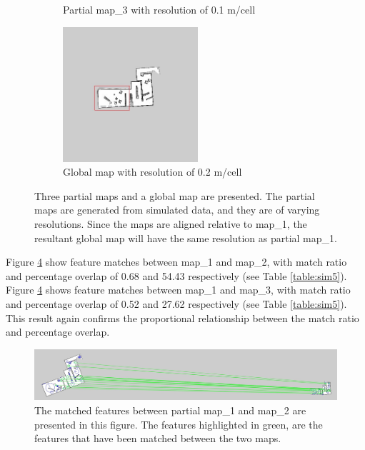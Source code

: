 \begin{figure}[H]
\begin{subfigure}{0.5\textwidth}
\caption{Partial map\_3 with resolution of 0.1 m/cell}
\label{fig:sim53}
\end{subfigure}
\begin{subfigure}{0.5\textwidth}
\centering
\includegraphics[width=0.9\linewidth, height=5cm]{figs/simulation_results/d_diff_resolution/final_map_marked.jpg} 
\caption{Global map with resolution of 0.2 m/cell}
\label{fig:sim54}
\end{subfigure}
\caption{Three partial maps and a global map are presented. The partial maps are generated from simulated data, and they are of varying resolutions. Since the maps are aligned relative to map\_1, the resultant global map will have the same resolution as partial map\_1.}
\label{fig:sim5}
\end{figure}

Figure \ref{fig:sim5match1} show feature matches between map\_1 and map\_2, with match ratio and percentage overlap of 0.68 and 54.43 respectively (see Table \ref{table:sim5}). Figure \ref{fig:sim5match1} shows feature matches between map\_1 and map\_3, with match ratio and percentage overlap of 0.52 and 27.62 respectively (see Table \ref{table:sim5}). This result again confirms the proportional relationship between the match ratio and percentage overlap.


\begin{figure}[H]
    \centering
    \includegraphics[width=1\textwidth]{figs/simulation_results/d_diff_resolution/matchesPartialMap1Map2.jpg}
    \caption{The matched features between partial map\_1 and map\_2 are presented in this figure. The features highlighted in green, are the features that have been matched between the two maps.}
    \label{fig:sim5match1}
\end{figure} 

